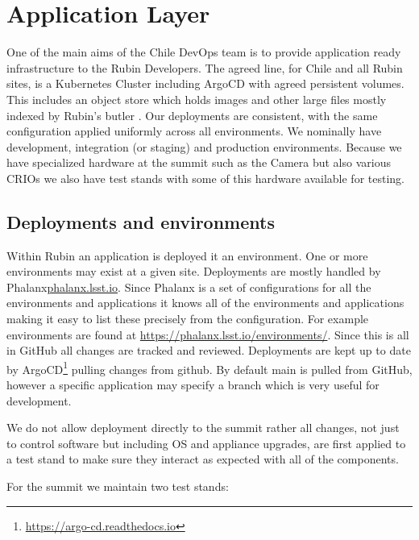 \section{Application Layer} \label{sec:application}

One of the main aims of the Chile DevOps team is to provide application ready infrastructure to the Rubin Developers.
The agreed line, for Chile and all Rubin sites, is a Kubernetes Cluster including ArgoCD with agreed persistent volumes.
This includes an object store which holds images and other large files mostly indexed by Rubin's butler \citep{2022SPIE12189E..11J}.
Our deployments are consistent, with the same configuration applied uniformly across all environments.
We nominally have development, integration (or staging)  and production environments.
Because we have specialized hardware at the summit such as the Camera but also various CRIOs we also
have test stands with some of this hardware available for testing.



\subsection{Deployments and environments}
Within Rubin an application is deployed it an environment.
One or more environments may exist at a given site.
Deployments are mostly  handled by Phalanx{\url{phalanx.lsst.io}}.
Since Phalanx is a set of configurations for all the environments and applications it
knows all of the environments and applications making it easy to list these precisely from the
configuration.
For example environments are found at \url{https://phalanx.lsst.io/environments/}.
Since this is all in GitHub all changes are tracked and reviewed.
Deployments are kept up to date by ArgoCD\footnote{\url{https://argo-cd.readthedocs.io}} pulling changes from
github.
By default main is pulled from GitHub,  however a specific application may specify a branch which is very useful for development.

We do not allow deployment directly to the summit rather all changes, not just to control software but  including OS and appliance upgrades, are first applied to a test stand to make sure they interact as expected with all of the components.


For the summit we maintain two test stands:

